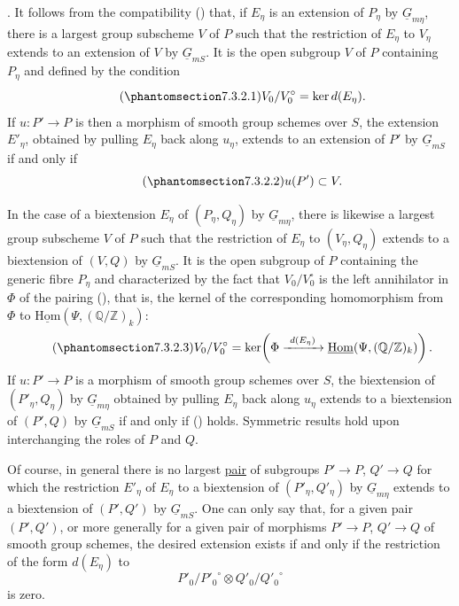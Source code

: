 
\medskip
\noindent {}.  It follows from the compatibility () that, if
$E_\eta$ is an extension of $P_\eta$ by $\underline G_{m\eta}$, there is a
largest group subscheme $V$ of $P$ such that the restriction of $E_\eta$ to
$V_\eta$ extends to an extension of $V$ by $\underline G_{mS}$.  It is the
open subgroup $V$ of $P$ containing $P_\eta$ and defined by the condition
\begin{equation}\tag{\SGARefTarget{sga7.sga7i.eviii.n7-3-2-1}{7.3.2.1}}
 V_0/V_0^{\circ}=\ker d(E_\eta).
\end{equation}
If $u:P'\to P$ is then a morphism of smooth group schemes over $S$, the
extension $E'_\eta$, obtained by pulling $E_\eta$ back along $u_\eta$,
extends to an extension of $P'$ by $\underline G_{mS}$ if and only if
\begin{equation}\tag{\SGARefTarget{sga7.sga7i.eviii.n7-3-2-2}{7.3.2.2}}
 u(P')\subset V.
\end{equation}

In the case of a biextension $E_\eta$ of $(P_\eta,Q_\eta)$ by
$\underline G_{m\eta}$, there is likewise a largest group subscheme $V$ of
$P$ such that the restriction of $E_\eta$ to $(V_\eta,Q_\eta)$ extends to
a biextension of $(V,Q)$ by $\underline G_{mS}$.  It is the open subgroup
of $P$ containing the generic fibre $P_\eta$ and characterized by the fact
that $V_0/V_0^{\circ}$ is the left annihilator in $\Phi$ of the pairing
(), that is, the kernel of the corresponding homomorphism from $\Phi$
to $\underline{\mathrm{Hom}}(\Psi,(\mathbb Q/\mathbb Z)_k)$:
\begin{equation}\tag{\SGARefTarget{sga7.sga7i.eviii.n7-3-2-3}{7.3.2.3}}
 V_0/V_0^{\circ}
 =\ker\!\left(
   \Phi\xrightarrow{\ d(E_\eta)\ }
   \underline{\mathrm{Hom}}(\Psi,(\mathbb Q/\mathbb Z)_k)
 \right).
\end{equation}
If $u:P'\to P$ is a morphism of smooth group schemes over $S$, the
biextension of $(P'_\eta,Q_\eta)$ by $\underline G_{m\eta}$ obtained by
pulling $E_\eta$ back along $u_\eta$ extends to a biextension of $(P',Q)$
by $\underline G_{mS}$ if and only if () holds.  Symmetric results
hold upon interchanging the roles of $P$ and $Q$.

Of course, in general there is no largest \underline{pair} of subgroups
$P'\to P$, $Q'\to Q$ for which the restriction $E'_\eta$ of $E_\eta$ to a
biextension of $(P'_\eta,Q'_\eta)$ by $\underline G_{m\eta}$ extends to a
biextension of $(P',Q')$ by $\underline G_{mS}$.  One can only say that,
for a given pair $(P',Q')$, or more generally for a given pair of
morphisms $P'\to P$, $Q'\to Q$ of smooth group schemes, the desired
extension exists if and only if the restriction of the form $d(E_\eta)$
to
\[
 P'_0/{P'_0}^{\circ}\otimes Q'_0/{Q'_0}^{\circ}
\]
is zero.

